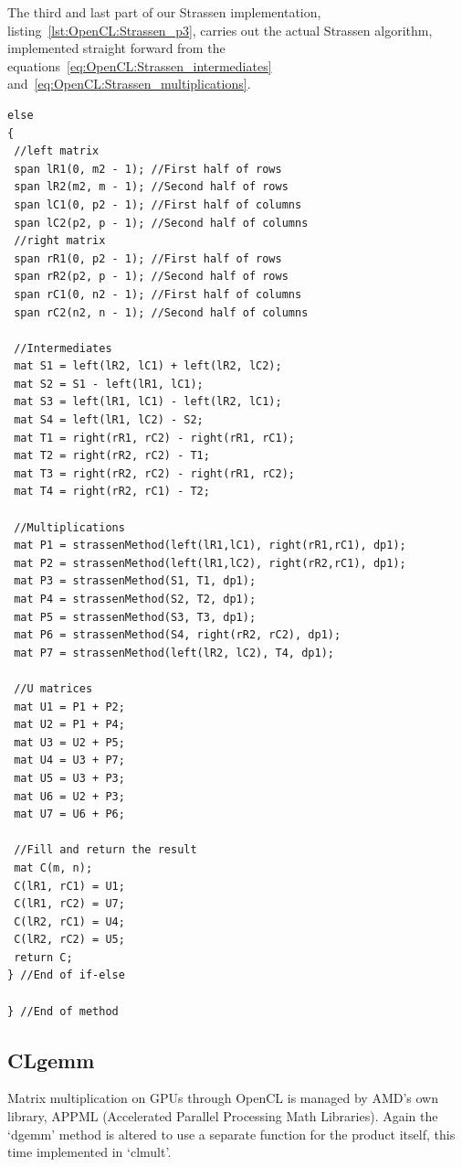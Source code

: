 The third and last part of our Strassen implementation, listing~\ref{lst:OpenCL:Strassen_p3}, carries out the actual Strassen algorithm, implemented straight forward from the equations~\eqref{eq:OpenCL:Strassen_intermediates} and~\eqref{eq:OpenCL:Strassen_multiplications}.
\begin{lstlisting}[float,label={lst:OpenCL:Strassen_p3},caption={Implementation of Strassen's method. Continuation of listing~\ref{lst:OpenCL:Strassen_p2}.},name={strassen_complete}]
else
{
 //left matrix
 span lR1(0, m2 - 1); //First half of rows
 span lR2(m2, m - 1); //Second half of rows
 span lC1(0, p2 - 1); //First half of columns
 span lC2(p2, p - 1); //Second half of columns
 //right matrix
 span rR1(0, p2 - 1); //First half of rows
 span rR2(p2, p - 1); //Second half of rows
 span rC1(0, n2 - 1); //First half of columns
 span rC2(n2, n - 1); //Second half of columns

 //Intermediates
 mat S1 = left(lR2, lC1) + left(lR2, lC2);
 mat S2 = S1 - left(lR1, lC1);
 mat S3 = left(lR1, lC1) - left(lR2, lC1);
 mat S4 = left(lR1, lC2) - S2;
 mat T1 = right(rR1, rC2) - right(rR1, rC1);
 mat T2 = right(rR2, rC2) - T1;
 mat T3 = right(rR2, rC2) - right(rR1, rC2);
 mat T4 = right(rR2, rC1) - T2;

 //Multiplications
 mat P1 = strassenMethod(left(lR1,lC1), right(rR1,rC1), dp1);
 mat P2 = strassenMethod(left(lR1,lC2), right(rR2,rC1), dp1);
 mat P3 = strassenMethod(S1, T1, dp1);
 mat P4 = strassenMethod(S2, T2, dp1);
 mat P5 = strassenMethod(S3, T3, dp1);
 mat P6 = strassenMethod(S4, right(rR2, rC2), dp1);
 mat P7 = strassenMethod(left(lR2, lC2), T4, dp1);

 //U matrices
 mat U1 = P1 + P2;
 mat U2 = P1 + P4;
 mat U3 = U2 + P5;
 mat U4 = U3 + P7;
 mat U5 = U3 + P3;
 mat U6 = U2 + P3;
 mat U7 = U6 + P6;

 //Fill and return the result
 mat C(m, n);
 C(lR1, rC1) = U1;
 C(lR1, rC2) = U7;
 C(lR2, rC1) = U4;
 C(lR2, rC2) = U5;
 return C;
} //End of if-else
 
} //End of method
\end{lstlisting}







\subsection{CLgemm}
Matrix multiplication on GPUs through OpenCL is managed by AMD's own library, APPML (Accelerated Parallel Processing Math Libraries).
Again the `dgemm' method is altered to use a separate function for the product itself, this time implemented in `clmult'.

